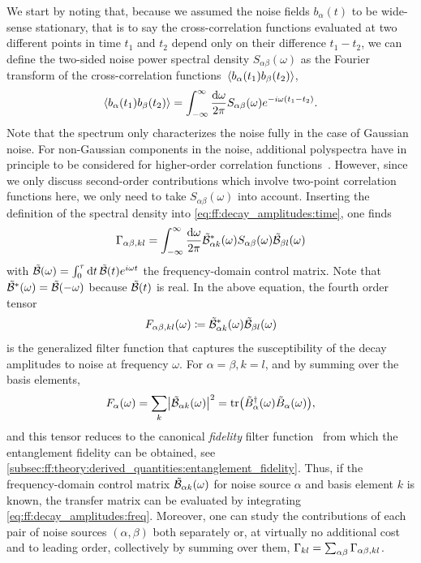 We start by noting that, because we assumed the noise fields $b_\alpha(t)$ to be wide-sense stationary, that is to say the cross-correlation functions evaluated at two different points in time $t_1$ and $t_2$ depend only on their difference $t_1 - t_2$, we can define the two-sided noise power spectral density $S_{\alpha\beta}(\omega)$ as the Fourier transform of the cross-correlation functions $\expval*{b_\alpha(t_1) b_\beta(t_2)}$,
\begin{equation}\label{eq:ff:spectral_density}
\expval{b_\alpha(t_1) b_{\beta}(t_2)} = \int_{-\infty}^{\infty}\frac{\dd{\omega}}{2\pi} S_{\alpha\beta}(\omega)e^{-i\omega (t_1 - t_2)}.
\end{equation}
Note that the spectrum only characterizes the noise fully in the case of Gaussian noise.
For non-Gaussian components in the noise, additional polyspectra have in principle to be considered for higher-order correlation functions~\cite{Norris2016}.
However, since we only discuss second-order contributions which involve two-point correlation functions here, we only need to take $S_{\alpha\beta}(\omega)$ into account.
Inserting the definition of the spectral density into \cref{eq:ff:decay_amplitudes:time}, one finds
\begin{equation}\label{eq:ff:decay_amplitudes:freq}
\Gamma_{\alpha\beta,kl} = \int_{-\infty}^{\infty}\frac{\dd{\omega}}{2\pi}\tilde{\mathcal{B}}^\ast_{\alpha k}(\omega)S_{\alpha\beta}(\omega)\tilde{\mathcal{B}}_{\beta l}(\omega)
\end{equation}
with $\tilde{\mathcal{B}}(\omega) = \int_0^\tau\dd{t}\tilde{\mathcal{B}}(t)e^{i\omega t}$ the frequency-domain control matrix.
Note that $\tilde{\mathcal{B}}^\ast(\omega) = \tilde{\mathcal{B}}(-\omega)$ because $\tilde{\mathcal{B}}(t)$ is real.
In the above equation, the fourth order tensor
\begin{equation}\label{eq:ff:filter_function:generalized}
F_{\alpha\beta,kl}(\omega)\coloneqq\tilde{\mathcal{B}}^\ast_{\alpha k}(\omega)\tilde{\mathcal{B}}_{\beta l}(\omega)
\end{equation}
is the generalized filter function that captures the susceptibility of the decay amplitudes to noise at frequency $\omega$.
For $\alpha = \beta, k = l$, and by summing over the basis elements,
\begin{equation}\label{eq:ff:filter_function:fidelity}
F_{\alpha}(\omega) = \sum_k\bigl\lvert\tilde{\mathcal{B}}_{\alpha k}(\omega)\bigr\rvert^2 = \tr(\tilde{B}_\alpha^\dagger(\omega)\tilde{B}_\alpha(\omega)),
\end{equation}
and this tensor reduces to the canonical \emph{fidelity} filter function~\cite{Green2012} from which the entanglement fidelity can be obtained, see \cref{subsec:ff:theory:derived_quantities:entanglement_fidelity}.
Thus, if the frequency-domain control matrix $\tilde{\mathcal{B}}_{\alpha k}(\omega)$ for noise source $\alpha$ and basis element $k$ is known, the transfer matrix can be evaluated by integrating \cref{eq:ff:decay_amplitudes:freq}.
Moreover, one can study the contributions of each pair of noise sources $(\alpha, \beta)$ both separately or, at virtually no additional cost and to leading order, collectively by summing over them, $\Gamma_{kl} = \sum_{\alpha\beta}\Gamma_{\alpha\beta,kl}$.

